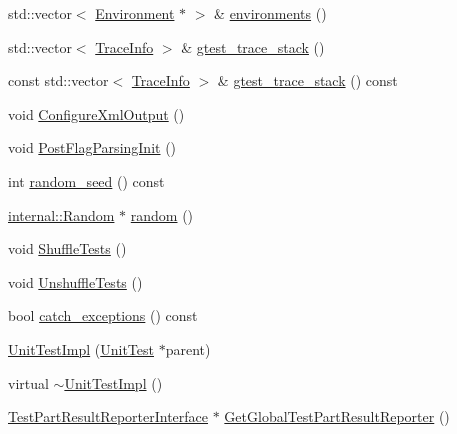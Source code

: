 \begin{DoxyCompactItemize}
\item 
std\-::vector$<$ \hyperlink{classtesting_1_1_environment}{Environment} $\ast$ $>$ \& \hyperlink{classtesting_1_1internal_1_1_unit_test_impl_aa1489e6a2378d64d68bc01963ea5db4a}{environments} ()
\item 
std\-::vector$<$ \hyperlink{structtesting_1_1internal_1_1_trace_info}{Trace\-Info} $>$ \& \hyperlink{classtesting_1_1internal_1_1_unit_test_impl_af8c7c0a0c954e36d83e6e4690d3fb938}{gtest\-\_\-trace\-\_\-stack} ()
\item 
const std\-::vector$<$ \hyperlink{structtesting_1_1internal_1_1_trace_info}{Trace\-Info} $>$ \& \hyperlink{classtesting_1_1internal_1_1_unit_test_impl_a1fa664f26839f3192f63afb502dee09d}{gtest\-\_\-trace\-\_\-stack} () const 
\item 
void \hyperlink{classtesting_1_1internal_1_1_unit_test_impl_a21cd7b2928de03a55b5252f29dd5ae6d}{Configure\-Xml\-Output} ()
\item 
void \hyperlink{classtesting_1_1internal_1_1_unit_test_impl_a772894193104b1b2516f16e6ff813168}{Post\-Flag\-Parsing\-Init} ()
\item 
int \hyperlink{classtesting_1_1internal_1_1_unit_test_impl_a8ec59a7ab3bad96bccde98ce85ffc864}{random\-\_\-seed} () const 
\item 
\hyperlink{classtesting_1_1internal_1_1_random}{internal\-::\-Random} $\ast$ \hyperlink{classtesting_1_1internal_1_1_unit_test_impl_ab3b45b5eb4d583219a3602011ea44347}{random} ()
\item 
void \hyperlink{classtesting_1_1internal_1_1_unit_test_impl_aaaa38e6a4372e6bb9bbe3143a3a32b65}{Shuffle\-Tests} ()
\item 
void \hyperlink{classtesting_1_1internal_1_1_unit_test_impl_a1ee7db3bf8284dd9dce4dc857564bce3}{Unshuffle\-Tests} ()
\item 
bool \hyperlink{classtesting_1_1internal_1_1_unit_test_impl_a0bbc6e237776ee6afaee106fe83e0406}{catch\-\_\-exceptions} () const 
\item 
\hyperlink{classtesting_1_1internal_1_1_unit_test_impl_a5fb75faa88ee71f26e16473455b70839}{Unit\-Test\-Impl} (\hyperlink{classtesting_1_1_unit_test}{Unit\-Test} $\ast$parent)
\item 
virtual \hyperlink{classtesting_1_1internal_1_1_unit_test_impl_aa136baecffdff7a61c54c4570d3f7e7f}{$\sim$\-Unit\-Test\-Impl} ()
\item 
\hyperlink{classtesting_1_1_test_part_result_reporter_interface}{Test\-Part\-Result\-Reporter\-Interface} $\ast$ \hyperlink{classtesting_1_1internal_1_1_unit_test_impl_a7b5bb4e2e66b312a6d5d2c135527be32}{Get\-Global\-Test\-Part\-Result\-Reporter} ()

\end{DoxyCompactItemize}

